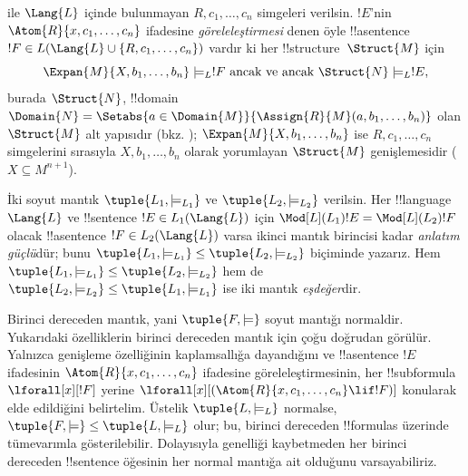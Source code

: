 \documentclass[../../../include/open-logic-section]{subfiles}
\begin{document}
\begin{defn}
\begin{enumerate}
  ile $\Lang{L}$ içinde bulunmayan $R,c_1,\dots,c_n$ simgeleri verilsin.
  $!E$'nin $\Atom{R}{x,c_1,\dots,c_n}$ ifadesine
  \emph{göreleleştirmesi} denen öyle !!a{sentence}
  $!F\in L(\Lang{L}\cup\{R,c_1,\ldots,c_n\})$ vardır ki her
  !!{structure}~$\Struct{M}$ için
  \[
  \Expan{M}{X,b_1,\ldots,b_n}\models_L !F \text{ ancak ve ancak }
  \Struct{N}\models_L !E,
  \]
  burada $\Struct{N}$, !!{domain}
  $\Domain{N}=\Setabs{a\in\Domain{M}}{\Assign{R}{M}(a,b_1,\dots,b_n)}$
  olan $\Struct{M}$ alt yapısıdır (bkz. );
  $\Expan{M}{X,b_1,\ldots,b_n}$ ise $R,c_1,\dots,c_n$ simgelerini sırasıyla
  $X,b_1,\dots,b_n$ olarak yorumlayan $\Struct{M}$ genişlemesidir
  ($X\subseteq M^{n+1}$).
\end{enumerate}
\end{defn}

\begin{defn}
İki soyut mantık $\tuple{L_1,\models_{L_1}}$ ve
$\tuple{L_2,\models_{L_2}}$ verilsin. Her !!{language} $\Lang{L}$ ve
!!{sentence} $!E\in L_1(\Lang{L})$ için
$\Mod[L](L_1){!E}=\Mod[L](L_2){!F}$ olacak !!a{sentence}
$!F\in L_2(\Lang{L})$ varsa ikinci mantık birincisi kadar
\emph{anlatım güçlü}dür; bunu
$\tuple{L_1,\models_{L_1}}\leq\tuple{L_2,\models_{L_2}}$ biçiminde yazarız.
Hem $\tuple{L_1,\models_{L_1}}\leq\tuple{L_2,\models_{L_2}}$ hem de
$\tuple{L_2,\models_{L_2}}\leq\tuple{L_1,\models_{L_1}}$ ise iki mantık
\emph{eşdeğer}dir.
\end{defn}

\begin{rem}
  Birinci dereceden mantık, yani $\tuple{F,\models}$ soyut mantığı normaldir.
  Yukarıdaki özelliklerin birinci dereceden mantık için çoğu doğrudan
  görülür. Yalnızca genişleme özelliğinin kaplamsallığa dayandığını ve
  !!a{sentence} $!E$ ifadesinin $\Atom{R}{x,c_1,\dots,c_n}$ ifadesine
  göreleleştirmesinin, her !!{subformula}
  $\lforall[x][!F]$ yerine
  $\lforall[x][(\Atom{R}{x,c_1,\dots,c_n}\lif !F)]$ konularak elde
  edildiğini belirtelim. Üstelik $\tuple{L,\models_L}$ normalse,
  $\tuple{F,\models}\leq\tuple{L,\models_L}$ olur; bu, birinci dereceden
  !!{formula}s üzerinde tümevarımla gösterilebilir. Dolayısıyla genelliği
  kaybetmeden her birinci dereceden !!{sentence} öğesinin her normal mantığa
  ait olduğunu varsayabiliriz.
\end{rem}
\end{document}
